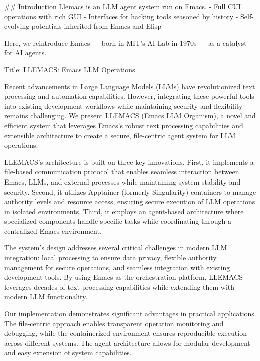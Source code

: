 
## Introduction
Llemacs is an LLM agent system run on Emacs.
- Full CUI operations with rich GUI
- Interfaces for hacking tools seasoned by history
- Self-evolving potentials inherited from Emacs and Elisp

Here, we reintroduce Emacs — born in MIT's AI Lab in 1970s — as a catalyst for AI agents.


Title: LLEMACS: Emacs LLM Operations



Recent advancements in Large Language Models (LLMs) have revolutionized text processing and automation capabilities. However, integrating these powerful tools into existing development workflows while maintaining security and flexibility remains challenging. We present LLEMACS (Emacs LLM Organism), a novel and efficient system that leverages Emacs's robust text processing capabilities and extensible architecture to create a secure, file-centric agent system for LLM operations.

LLEMACS's architecture is built on three key innovations. First, it implements a file-based communication protocol that enables seamless interaction between Emacs, LLMs, and external processes while maintaining system stability and security. Second, it utilizes Apptainer (formerly Singularity) containers to manage authority levels and resource access, ensuring secure execution of LLM operations in isolated environments. Third, it employs an agent-based architecture where specialized components handle specific tasks while coordinating through a centralized Emacs environment.

The system's design addresses several critical challenges in modern LLM integration: local processing to ensure data privacy, flexible authority management for secure operations, and seamless integration with existing development tools. By using Emacs as the orchestration platform, LLEMACS leverages decades of text processing capabilities while extending them with modern LLM functionality.

Our implementation demonstrates significant advantages in practical applications. The file-centric approach enables transparent operation monitoring and debugging, while the containerized environment ensures reproducible execution across different systems. The agent architecture allows for modular development and easy extension of system capabilities.



